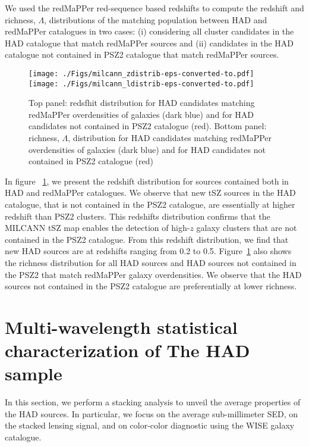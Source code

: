 \documentclass[traditabstract,a4,twocolumn]{aa}
\begin{document}
 We used the redMaPPer red-sequence based redshifts to compute the
  redshift and richness, $\Lambda$, distributions of the matching
  population between HAD and redMaPPer catalogues in two cases: (i)
  considering all cluster candidates in the HAD catalogue that
  match redMaPPer sources and (ii) candidates in the HAD catalogue not
  contained in PSZ2 catalogue that match redMaPPer sources.

\begin{figure}[!th]
\begin{center}
\texttt{[image: ./Figs/milcann\_zdistrib-eps-converted-to.pdf]}
\texttt{[image: ./Figs/milcann\_ldistrib-eps-converted-to.pdf]}
\caption{Top panel: redsfhit distribution for HAD candidates matching
  redMaPPer overdensities of galaxies (dark blue) and for HAD
  candidates not contained in PSZ2 catalogue (red). Bottom panel:
  richness, $\Lambda$, distribution for HAD candidates matching
  redMaPPer overdensities of galaxies (dark blue) and for HAD
  candidates not contained in PSZ2 catalogue (red)}
\label{zdis}
\end{center}
\end{figure}

In figure ~\ref{zdis}, we present the redshift distribution for
sources contained both in HAD and redMaPPer catalogues.  We observe that
new tSZ sources in the HAD catalogue, that is not contained in the PSZ2
catalogue, are essentially at higher redshift than PSZ2
clusters. This redshifts distribution confirms that the MILCANN tSZ
map enables the detection of high-$z$ galaxy clusters that are not
contained in the PSZ2 catalogue. From this redshift distribution, we
find that new HAD sources are at redshifts ranging from 0.2 to
0.5. Figure~\ref{zdis} also shows the richness distribution for all
HAD sources and HAD sources not contained in the PSZ2 that match
redMaPPer galaxy overdensities. We observe that the HAD sources not
contained in the PSZ2 catalogue are preferentially at lower
richness.

\section{Multi-wavelength statistical characterization of The HAD sample}
\label{sec_probe}

In this section, we perform a stacking analysis to unveil the average
properties of the HAD sources. In particular, we
focus on the average sub-millimeter SED, on the stacked lensing
signal, and on color-color diagnostic using the WISE galaxy catalogue.
\end{document}
